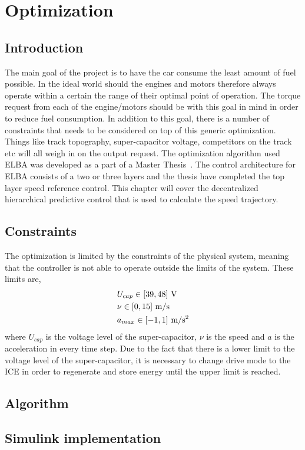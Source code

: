 \chapter{Optimization}
\section{Introduction}
The main goal of the project is to have the car consume the least amount of fuel
possible. In the ideal world should the engines and motors therefore always operate
within a certain the range of their optimal point of operation. The torque request
from each of the engine/motors should be with this goal in mind in order to reduce
fuel consumption. In addition to this goal, there is a number of constraints that
needs to be considered on top of this generic optimization.  Things like track
topography, super-capacitor voltage, competitors on the track etc will all weigh in
on the output request. The optimization algorithm used ELBA was developed as a part
of a Master Thesis~\cite{lui2016}. The control architecture for ELBA consists of a
two or three layers and the thesis have completed the top layer speed reference
control. This chapter will cover the decentralized hierarchical predictive control
that is used to calculate the speed trajectory.

\section{Constraints}
The optimization is limited by the constraints of the physical system, meaning that
the controller is not able to operate outside the limits of the system. These limits
are,
\begin{align}
    &U_{cap} \in [39,48]~\textup{V} \\
    &\nu \in [0,15]~\textup{m/s}\\
    &a_{max} \in [-1,1]~\textup{m/s$^2$}
\end{align}
where $U_{cap}$ is the voltage level of the super-capacitor, $\nu$ is the speed and
$a$ is the acceleration in every time step. Due to the fact that there is a lower
limit to the voltage level of the super-capacitor, it is necessary to change
drive mode to the ICE in order to regenerate and store energy until the upper limit is
reached. 

\section{Algorithm}

\section{Simulink implementation}
